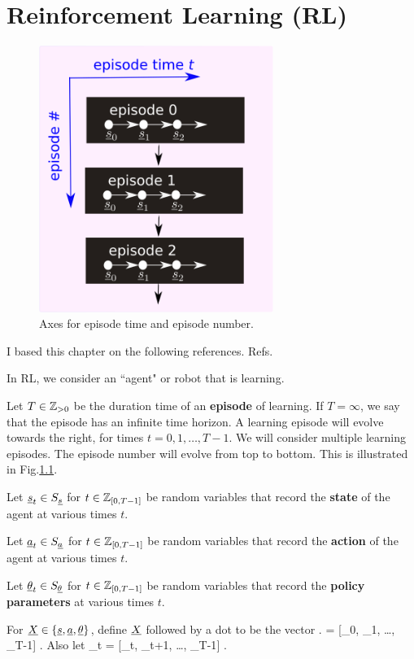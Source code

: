 \chapter{Reinforcement Learning (RL)}
\begin{figure}[h!]
\centering
\includegraphics[width=3in]{RL/episodes.png}
\caption{Axes 
for episode time and episode number.} 
\label{fig-epi}
\end{figure}

I based this chapter on the following 
references. Refs.\cite{fox}\cite{levine}

In RL, we consider an ``agent" or
robot that
is learning. 

Let $T\in {\mathbb{Z}}_{>0}$ be the duration time
of an {\bf episode} of learning.
If $T=\infty$, we say that the episode
has an infinite time horizon.
A learning episode will 
 evolve
towards the right,
 for times $t=0,1, \ldots, T-1$. 
We will consider multiple learning episodes.
The episode number will
evolve from top to bottom.
This is illustrated in Fig.\ref{fig-epi}.

 Let ${\underline{s}}_t\in S_{\underline{s}} $ 
for $t\in {\mathbb{Z}}_{[0,T-1]}$ be random variables that record the {\bf state} of the agent at various times $t$.

Let ${\underline{a}}_t\in S_{\underline{a}}$ for 
$t\in {\mathbb{Z}}_{[0,T-1]}$ be random variables that record the {\bf action} of the agent at various times $t$.

Let ${\underline{\theta}}_t\in S_{\underline{\theta}}$ 
for $t\in {\mathbb{Z}}_{[0,T-1]}$ be 
random variables that record the
 {\bf policy parameters} 
at various times $t$.



For ${\underline{X}}\in \{{\underline{s}}, {\underline{a}}, {\underline{\theta}}\}$, define ${\underline{X}}$ followed by a dot to be the vector 
\beq
\rvX. = 
[\rvX_0, \rvX_1, \ldots, \rvX_{T-1}]
\;.
\eeq
Also let
\beq
\rvX_{\geq t} = 
[\rvX_t, \rvX_{t+1}, \ldots, \rvX_{T-1}]
\;.
\eeq

